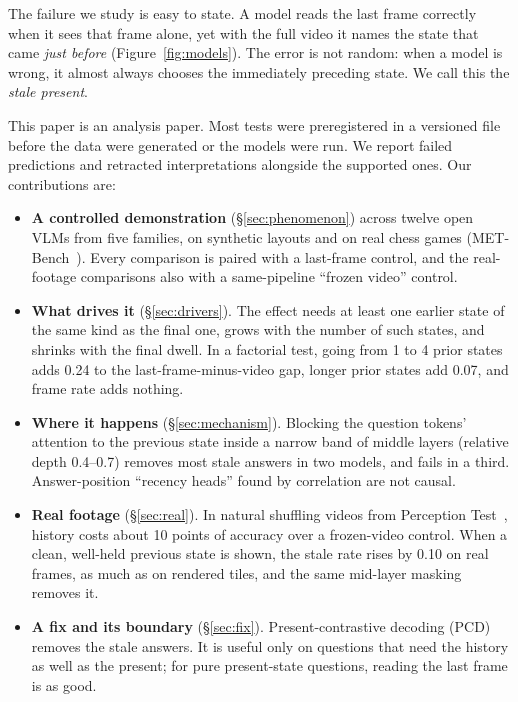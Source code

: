 \documentclass[10pt,twocolumn,letterpaper]{article}
\begin{document}
The failure we study is easy to state. A model reads the last frame correctly when it sees that frame alone, yet with the full video it names the state that came \emph{just before} (Figure~\ref{fig:models}). The error is not random: when a model is wrong, it almost always chooses the immediately preceding state. We call this the \emph{stale present}.

This paper is an analysis paper. Most tests were preregistered in a versioned file before the data were generated or the models were run. We report failed predictions and retracted interpretations alongside the supported ones. Our contributions are:
\begin{itemize}
  \item \textbf{A controlled demonstration} (\S\ref{sec:phenomenon}) across twelve open VLMs from five families, on synthetic layouts and on real chess games (MET-Bench~\cite{cohen2026metbench}). Every comparison is paired with a last-frame control, and the real-footage comparisons also with a same-pipeline ``frozen video'' control.
  \item \textbf{What drives it} (\S\ref{sec:drivers}). The effect needs at least one earlier state of the same kind as the final one, grows with the number of such states, and shrinks with the final dwell. In a factorial test, going from 1 to 4 prior states adds 0.24 to the last-frame-minus-video gap, longer prior states add 0.07, and frame rate adds nothing.
  \item \textbf{Where it happens} (\S\ref{sec:mechanism}). Blocking the question tokens' attention to the previous state inside a narrow band of middle layers (relative depth 0.4--0.7) removes most stale answers in two models, and fails in a third. Answer-position ``recency heads'' found by correlation are not causal.
  \item \textbf{Real footage} (\S\ref{sec:real}). In natural shuffling videos from Perception Test~\cite{patraucean2023perception}, history costs about 10 points of accuracy over a frozen-video control. When a clean, well-held previous state is shown, the stale rate rises by 0.10 on real frames, as much as on rendered tiles, and the same mid-layer masking removes it.
  \item \textbf{A fix and its boundary} (\S\ref{sec:fix}). Present-contrastive decoding (PCD) removes the stale answers. It is useful only on questions that need the history as well as the present; for pure present-state questions, reading the last frame is as good.
\end{itemize}
\end{document}
